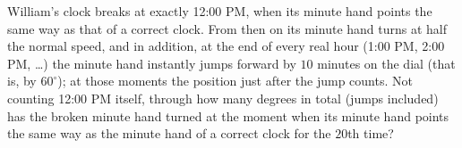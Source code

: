 William's clock breaks at exactly 12:00 PM, when its minute hand points the same way as that of a correct clock. From then on its minute hand turns at half the normal speed, and in addition, at the end of every real hour (1:00 PM, 2:00 PM, \ldots) the minute hand instantly jumps forward by $10$ minutes on the dial (that is, by $60^\circ$); at those moments the position just after the jump counts. Not counting 12:00 PM itself, through how many degrees in total (jumps included) has the broken minute hand turned at the moment when its minute hand points the same way as the minute hand of a correct clock for the $20$th time?
